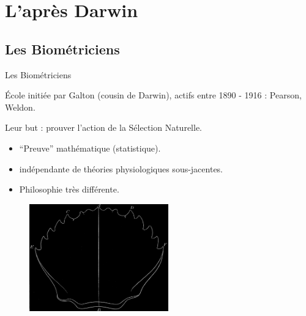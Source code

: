 \documentclass[8pt]{beamer}
\begin{document}
\section{L'après Darwin}
\subsection{Les Biométriciens}
\begin{frame}{Les Biométriciens}
	
\'Ecole initiée par Galton (cousin de Darwin), actifs entre 1890 - 1916 : Pearson, Weldon.
\vfil

Leur but : prouver l'action de la Sélection Naturelle.
	\begin{itemize}
		\item ``Preuve'' mathématique (statistique).
		\item indépendante de théories physiologiques sous-jacentes.
		\item Philosophie très différente.
	\end{itemize}
	\begin{figure}[h]
		\begin{center}
			\includegraphics[width=6cm]{images/crabe.png}
		\end{center}
		\label{fig:crabe}
	\end{figure}



\end{frame}
\end{document}
